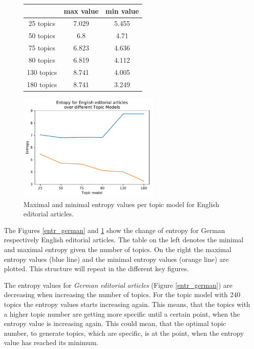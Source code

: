 \begin{figure}
	\begin{minipage}{0.5\textwidth}
		\centering
		\begin{tabular}[t]{c|cc}
			&max value & min value\\
			\hline
			25 topics&7.029&5.455\\
			50 topics&6.8&4.71\\
			75 topics&6.823&4.636\\
			80 topics&	6.819&4.112\\
			130 topics & 8.741&4.005\\
			180 topics&	8.741&3.249\\
		\end{tabular}
	\end{minipage}%
	\begin{minipage}{0.5\textwidth}
		\centering
		\includegraphics[width=7cm]{gfx/Eval_IC/English_Editorial_Entropy.pdf}
	\end{minipage}
	\caption{Maximal and minimal entropy values per topic model for English editorial articles.}
	\label{entr_english}
\end{figure}
The Figures \ref{entr_german} and \ref{entr_english} show the change of entropy for German respectively English editorial articles. The table on the left denotes the minimal and maximal entropy given the number of topics. On the right the maximal entropy values (blue line) and the minimal entropy values (orange line) are plotted. This structure will repeat in the different key figures.

The entropy values for \textit{German editorial articles} (Figure \ref{entr_german}) are decreasing when increasing the number of topics. For the topic model with 240 topics the entropy values starts increasing again. This means, that the topics with a higher topic number are getting more specific until a certain point, when the entropy value is increasing again. This could mean, that the optimal topic number, to generate topics, which are specific, is at the point, when the entropy value has reached its minimum.

